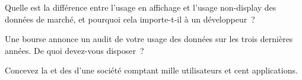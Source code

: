 \begin{interviewq}\label{iq:pl:market-data-distribution-and-entitlements:3}
Quelle est la différence entre l'usage en affichage et l'usage non-display des données de marché, et pourquoi cela importe-t-il à un développeur~?
\end{interviewq}

\begin{interviewq}\label{iq:pl:market-data-distribution-and-entitlements:4}
Une bourse annonce un audit de votre usage des données sur les trois dernières années. De quoi devez-vous disposer~?
\end{interviewq}

\begin{interviewq}\label{iq:pl:market-data-distribution-and-entitlements:5}
Concevez la  et des  d'une société comptant mille utilisateurs et cent applications.
\end{interviewq}
